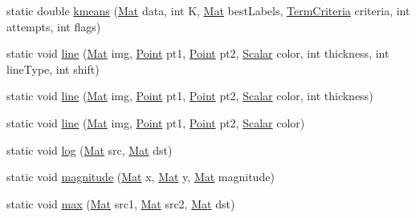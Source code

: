 \begin{DoxyCompactItemize}
\item 
static double \mbox{\hyperlink{classorg_1_1opencv_1_1core_1_1_core_a5e0e7f71bc5434aedfbca27eb1a51450}{kmeans}} (\mbox{\hyperlink{classorg_1_1opencv_1_1core_1_1_mat}{Mat}} data, int K, \mbox{\hyperlink{classorg_1_1opencv_1_1core_1_1_mat}{Mat}} best\+Labels, \mbox{\hyperlink{classorg_1_1opencv_1_1core_1_1_term_criteria}{Term\+Criteria}} criteria, int attempts, int flags)
\item 
static void \mbox{\hyperlink{classorg_1_1opencv_1_1core_1_1_core_a9273ae8a7351870e645bd3a185af79b9}{line}} (\mbox{\hyperlink{classorg_1_1opencv_1_1core_1_1_mat}{Mat}} img, \mbox{\hyperlink{classorg_1_1opencv_1_1core_1_1_point}{Point}} pt1, \mbox{\hyperlink{classorg_1_1opencv_1_1core_1_1_point}{Point}} pt2, \mbox{\hyperlink{classorg_1_1opencv_1_1core_1_1_scalar}{Scalar}} color, int thickness, int line\+Type, int shift)
\item 
static void \mbox{\hyperlink{classorg_1_1opencv_1_1core_1_1_core_aae5f5687ccac9691ecb1c5ee0d99575a}{line}} (\mbox{\hyperlink{classorg_1_1opencv_1_1core_1_1_mat}{Mat}} img, \mbox{\hyperlink{classorg_1_1opencv_1_1core_1_1_point}{Point}} pt1, \mbox{\hyperlink{classorg_1_1opencv_1_1core_1_1_point}{Point}} pt2, \mbox{\hyperlink{classorg_1_1opencv_1_1core_1_1_scalar}{Scalar}} color, int thickness)
\item 
static void \mbox{\hyperlink{classorg_1_1opencv_1_1core_1_1_core_ae8bbb241c117c20adae94f394110473c}{line}} (\mbox{\hyperlink{classorg_1_1opencv_1_1core_1_1_mat}{Mat}} img, \mbox{\hyperlink{classorg_1_1opencv_1_1core_1_1_point}{Point}} pt1, \mbox{\hyperlink{classorg_1_1opencv_1_1core_1_1_point}{Point}} pt2, \mbox{\hyperlink{classorg_1_1opencv_1_1core_1_1_scalar}{Scalar}} color)
\item 
static void \mbox{\hyperlink{classorg_1_1opencv_1_1core_1_1_core_a34d89a9c8e2562fc85bfecca3dca7d76}{log}} (\mbox{\hyperlink{classorg_1_1opencv_1_1core_1_1_mat}{Mat}} src, \mbox{\hyperlink{classorg_1_1opencv_1_1core_1_1_mat}{Mat}} dst)
\item 
static void \mbox{\hyperlink{classorg_1_1opencv_1_1core_1_1_core_ac0195922fb03d6bad195054e615cb4e1}{magnitude}} (\mbox{\hyperlink{classorg_1_1opencv_1_1core_1_1_mat}{Mat}} x, \mbox{\hyperlink{classorg_1_1opencv_1_1core_1_1_mat}{Mat}} y, \mbox{\hyperlink{classorg_1_1opencv_1_1core_1_1_mat}{Mat}} magnitude)
\item 
static void \mbox{\hyperlink{classorg_1_1opencv_1_1core_1_1_core_aae8ad4feaca1ca8234bd88cbf9090cf5}{max}} (\mbox{\hyperlink{classorg_1_1opencv_1_1core_1_1_mat}{Mat}} src1, \mbox{\hyperlink{classorg_1_1opencv_1_1core_1_1_mat}{Mat}} src2, \mbox{\hyperlink{classorg_1_1opencv_1_1core_1_1_mat}{Mat}} dst)

\end{DoxyCompactItemize}
